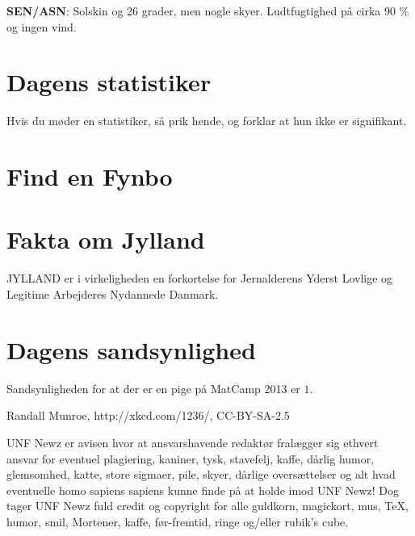 \begin{minipage}[b]{0.95\linewidth}
\begin{minipage}[t]{0.47\textwidth}
\textbf{SEN/ASN}: Solskin og 26 grader, men nogle skyer. Ludtfugtighed på cirka 90 \% og ingen vind.

\vspace{-2mm}
\section*{Dagens statistiker}
Hvis du møder en statistiker, så prik hende, og forklar at hun ikke er signifikant.

\vspace{-2mm}
\section*{Find en Fynbo}

\vspace{-2mm}
\section*{Fakta om Jylland}
JYLLAND er i virkeligheden en forkortelse for Jernalderens Yderst Lovlige og Legitime Arbejderes Nydannede Danmark.

\vspace{-2mm}
\section*{Dagens sandsynlighed}
Sandsynligheden for at der er en pige på MatCamp 2013 er $1$.

\vspace{1mm}
\tiny Randall Munroe, http://xkcd.com/1236/, CC-BY-SA-2.5
\end{minipage}

\begin{center}
\tiny UNF Newz er avisen hvor at ansvarshavende redaktør fralægger sig ethvert ansvar for eventuel plagiering, kaniner, tysk, stavefelj, kaffe, dårlig humor, glemsomhed, katte, store sigmaer, pile, skyer, dårlige oversættelser og alt hvad eventuelle homo sapiens sapiens kunne finde på at holde imod UNF Newz! Dog tager UNF Newz fuld credit og copyright for alle guldkorn, magickort, mus, \TeX, humor, smil, Mortener, kaffe, før-fremtid, ringe og/eller rubik's cube.
\end{center}
\end{minipage}

